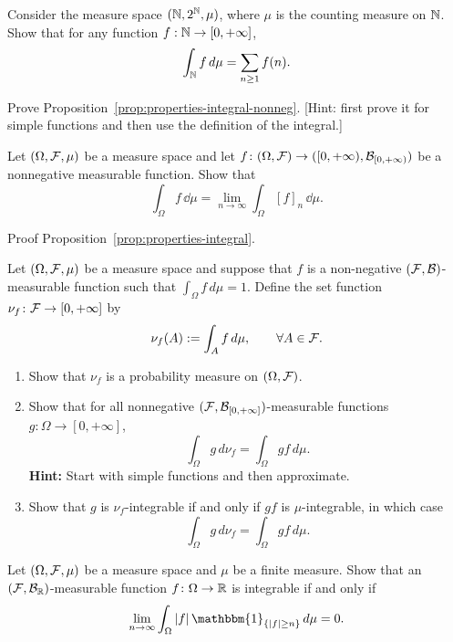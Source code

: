 \begin{problem}
	Consider the measure space $(\mathbb N,2^{\mathbb N},\mu)$, where $\mu$ is the counting measure on $\mathbb N$. Show that for any function $f:\mathbb N\to[0,+\infty]$,
	\[
		\int_{\mathbb N} f\,d\mu = \sum_{n\ge 1} f(n).
	\]
\end{problem}

\begin{problem}\label{prb:properties-integral-nonneg}
Prove Proposition~\ref{prop:properties-integral-nonneg}. [Hint: first prove it for simple functions and then use the definition of the integral.]
\end{problem}

\begin{problem}
	\label{prb:simple-approx-integral}
 Let $(\Omega, \mathcal F, \mu)$ be a measure space and let $f\colon (\Omega,\mathcal F) \to ([0,+\infty), \mathcal B_{[0,+\infty)})$ be a nonnegative measurable function. Show that
\[
\int_\Omega f\, \dd \mu = \lim_{n \to \infty} \int_\Omega [f]_n\, \dd \mu.
\]	
\end{problem}

\begin{problem}\label{prb:lebesgue_integral_general}
Proof Proposition~\ref{prop:properties-integral}.
\end{problem}

\begin{problem}\label{prb:measure}
	Let $(\Omega,\mathcal F,\mu)$ be a measure space and suppose that $f$ is a non-negative $(\mathcal F,\mathcal B)$-measurable function such that $\int_\Omega f\,d\mu=1$. Define the set function $\nu_f\colon\mathcal F\to[0,+\infty]$ by
	\[
		\nu_f(A):=\int_A f\,d\mu,\qquad \forall A\in\mathcal F.
	\]
	\begin{enumerate}[label=(\alph*)]
		\item Show that $\nu_f$ is a probability measure on $(\Omega,\mathcal F)$.
		\item Show that for all nonnegative $(\mathcal F,\mathcal B_{[0,+\infty]})$-measurable functions $g\colon\Omega\to [0,+\infty]$,
		\[
			\int_\Omega g\, d\nu_f = \int_\Omega g f\,d\mu.
		\]
		\textbf{Hint:} Start with simple functions and then approximate.
		\item Show that $g$ is $\nu_f$-integrable if and only if $g f$ is $\mu$-integrable, in which case
		\[
			\int_\Omega g\,d\nu_f = \int_\Omega g f\,d\mu.
		\]
	\end{enumerate}
\end{problem}


\begin{problem}
	Let $(\Omega,\mathcal F,\mu)$ be a measure space and $\mu$ be a finite measure. Show that an $(\mathcal F,\mathcal B_{\mathbb R})$-measurable function $f\colon\Omega\to \mathbb R$ is integrable if and only if
	\[
		\lim_{n\to\infty}\int_\Omega |f|\,\mathbbm{1}_{\{|f|\ge n\}}\,d\mu = 0.
	\]
\end{problem}


